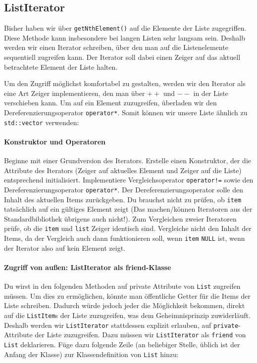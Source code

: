 \subsection{ListIterator}
Bisher haben wir über \lstinline{getNthElement()} auf die Elemente der Liste zugegriffen.
Diese Methode kann insbesondere bei langen Listen sehr langsam sein.
Deshalb werden wir einen Iterator schreiben, über den man auf die Listenelemente sequentiell zugreifen kann.
Der Iterator soll dabei einen Zeiger auf das aktuell betrachtete Element der Liste halten.

Um den Zugriff möglichst komfortabel zu gestalten, werden wir den Iterator als eine Art Zeiger implementieren, den man über \textbf{$++$} und \textbf{$--$} in der Liste verschieben kann.
Um auf ein Element zuzugreifen, überladen wir den Dereferenzierungsoperator \lstinline{operator*}.
Somit können wir unsere Liste ähnlich zu \lstinline{std::vector} verwenden:



\paragraph{Konstruktor und Operatoren} 
Beginne mit einer Grundversion des Iterators.
Erstelle einen Konstruktor, der die Attribute des Iterators (Zeiger auf aktuelles Element und Zeiger auf die Liste) entsprechend initialisiert.
Implementiere Vergleichsoperator \lstinline{operator!=} sowie den Dereferenzierungsoperator \lstinline{operator*}.
Der Dereferenzierungsoperator solle den Inhalt des aktuellen Items zurückgeben.
Du brauchst nicht zu prüfen, ob \lstinline{item} tatsächlich auf ein gültiges Element zeigt (Das machen/können Iteratoren aus der Standardbibliothek übrigens auch nicht!).
Zum Vergleichen zweier Iteratoren prüfe, ob die \lstinline{item} und \lstinline{list} Zeiger identisch sind.
Vergleiche nicht den Inhalt der Items, da der Vergleich auch dann funktionieren soll, wenn \lstinline{item} \lstinline{NULL} ist, wenn der Iterator also auf kein Element zeigt.



\paragraph{Zugriff von außen: ListIterator als friend-Klasse} Du wirst in den folgenden Methoden auf private Attribute von \lstinline{List} zugreifen müssen.
Um dies zu ermöglichen, könnte man öffentliche Getter für die Items der Liste schreiben.
Dadurch würde jedoch jeder die Möglichkeit bekommen, direkt auf die \lstinline{ListItem}s der Liste zuzugreifen, was dem Geheimnisprinzip zuwiderläuft.
Deshalb werden wir \lstinline{ListIterator} stattdessen explizit erlauben, auf \lstinline{private}-Attribute der Liste zuzugreifen.
Dazu müssen wir \lstinline{ListIterator} als \lstinline{friend} von \lstinline{List} deklarieren.
Füge dazu folgende Zeile (an beliebiger Stelle, üblich ist der Anfang der Klasse) zur Klassendefinition von \lstinline{List} hinzu:

